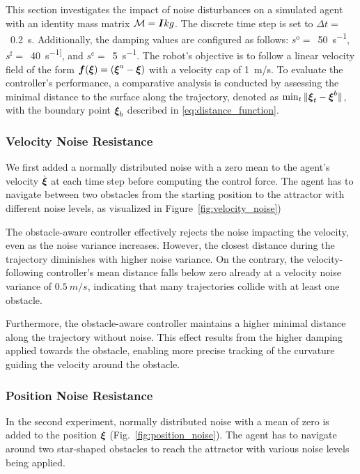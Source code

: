 This section investigates the impact of noise disturbances on a simulated agent with an identity mass matrix $\mathcal{M} = \boldsymbol{I} kg$. The discrete time step is set to $\Delta t = $~\qty{0.2}{s}. Additionally, the damping values are configured as follows: 
$s^{\mathrm{o}}=$~\qty{50}{s^{-1}},
$s^{\mathrm{f}}=$~\qty{40}{s^{-1]}}, and
$s^{\mathrm{c}}=$~\qty{5}{s^{-1}}.
The robot's objective is to follow a linear velocity field of the form $\boldsymbol{f}(\boldsymbol{\xi}) = (\boldsymbol{\xi}^a - \boldsymbol{\xi})$ with a velocity cap of \qty{1}{m/s}.
To evaluate the controller's performance, a comparative analysis is conducted by assessing the minimal distance to the surface along the trajectory, denoted as $ \min_t \| \boldsymbol{\xi}_t - \boldsymbol{\xi}^b \| $, with the boundary point $\boldsymbol{\xi}_b$ described in \eqref{eq:distance_function}. 

\subsubsection{Velocity Noise Resistance}
We first added a normally distributed noise with a zero mean to the agent's velocity $\dot{\boldsymbol{ \xi}}$ at each time step before computing the control force. The agent has to navigate between two obstacles from the starting position to the attractor with different noise levels, as visualized in Figure~\ref{fig:velocity_noise})

The obstacle-aware controller effectively rejects the noise impacting the velocity, even as the noise variance increases. However, the closest distance during the trajectory diminishes with higher noise variance. On the contrary, the velocity-following controller's mean distance falls below zero already at a velocity noise variance of $\qty{0.5}{m/s}$, indicating that many trajectories collide with at least one obstacle.

Furthermore, the obstacle-aware controller maintains a higher minimal distance along the trajectory without noise. This effect results from the higher damping applied towards the obstacle, enabling more precise tracking of the curvature guiding the velocity around the obstacle.

\subsubsection{Position Noise Resistance} \label{sec:position_noise}
In the second experiment, normally distributed noise with a mean of zero is added to the position $\boldsymbol{ \xi}$ (Fig.~\ref{fig:position_noise}). The agent has to navigate around two star-shaped obstacles to reach the attractor with various noise levels being applied.

